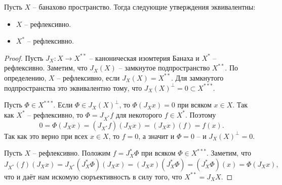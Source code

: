     \begin{theorem}\label{th:refref}
        Пусть $X$ -- банахово пространство.
        Тогда следующие утверждения эквивалентны:
        \begin{itemize}
            \item $X$ -- рефлексивно.
            \item $X^*$ -- рефлексивно.
        \end{itemize}
    \end{theorem}
    \begin{proof}
        Пусть $J_X\colon X \to X^{**}$ -- каноническая изомтерия Банаха и $X^*$ -- рефлексивно.
        Заметим, что $J_X(X)$ -- замкнутое подпространство $X^{**}$.
        По определению, $X$ -- рефлексивно, если $J_X(X) = X^{**}$.
        Для замкнутого подпространства это эквивалентно тому, что $J_X(X)^\perp = 0 \subset X^{***}$.

        Пусть $\Phi \in X^{***}$. Если $\Phi \in J_X(X)^\perp$, то $\Phi(J_X x) = 0$ при всяком $x \in X$. Так как $X^*$ -- рефлексивно, то $\Phi = J_{X^*}f$ для некоторого $f \in X^*$.
        Поэтому
        \[
            0 = \Phi(J_X x) = (J_{X^*} f)(J_X x) = (J_X x)(f) = f(x).
        \]
        Так как это верно при всех $x \in X$, то $f = 0$, а значит и $\Phi = 0$ -- и $J_X(X)^\perp = 0$.

        Пусть $X$ -- рефлексивно. Положим $f = J_X^* \Phi$ при всяком $\Phi \in X^{***}$.
        Заметим, что
        \[
            J_{X^*}(f)(J_X x) = J_{X^*}(J_{X}^*\Phi)(J_X x) = (J_X x)(J_{X}^{*}\Phi) = (J_{X}^{*}\Phi)(x) = \Phi(J_X x),
        \]
        что и даёт нам искомую сюръективность в силу того, что $X^{**} = J_X X$.
    \end{proof}
